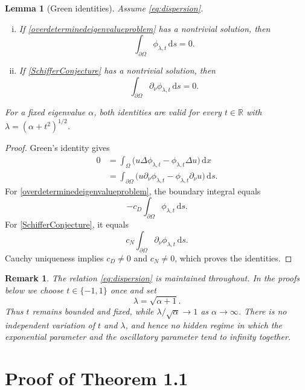 \documentclass[12pt]{article}
\newcommand{\R}{\mathbb{R}}
\numberwithin{equation}{section}
\newtheorem{lemma}[theorem]{Lemma}
\newtheorem{remark}[theorem]{Remark}
\numberwithin{equation}{section}
\newcommand{\pd}{\partial}
\newcommand{\dd}{\,\mathrm{d}}
\begin{document}
\begin{lemma}[Green identities]\label{prop:green}
Assume \eqref{eq:dispersion}.
\begin{enumerate}[(i)]
\item If \eqref{overdeterminedeigenvalueproblem} has a nontrivial solution, then
\begin{equation*}\label{eq:transform-D}
\int_{\pd\Omega}\phi_{\lambda,t}\dd s=0.
\end{equation*}
\item If \eqref{SchifferConjecture} has a nontrivial solution, then
\begin{equation*}\label{eq:transform-N}
\int_{\pd\Omega}\pd_\nu\phi_{\lambda,t}\dd s=0.
\end{equation*}
\end{enumerate}
For a fixed eigenvalue $\alpha$, both identities are valid for every
$t\in\R$ with $\lambda=\left(\alpha+t^2\right)^{1/2}$.
\end{lemma}

\begin{proof}
Green's identity gives
\begin{align*}
0
&=\int_\Omega
\bigl(u\Delta\phi_{\lambda,t}
-\phi_{\lambda,t}\Delta u\bigr)\dd x\\
&=\int_{\pd\Omega}
\bigl(u\pd_\nu\phi_{\lambda,t}
-\phi_{\lambda,t}\pd_\nu u\bigr)\dd s.
\end{align*}
For \eqref{overdeterminedeigenvalueproblem}, the boundary integral equals
\[
-c_D\int_{\pd\Omega}\phi_{\lambda,t}\dd s.
\]
For \eqref{SchifferConjecture}, it equals
\[
c_N\int_{\pd\Omega}\pd_\nu\phi_{\lambda,t}\dd s.
\]
Cauchy
uniqueness implies $c_D\ne0$ and $c_N\ne0$, which proves the identities.
\end{proof}

\begin{remark}
\emph{The relation \eqref{eq:dispersion} is maintained throughout. In the proofs
below we choose $t\in\{-1,1\}$ once and set
\[
\lambda=\sqrt{\alpha+1}.
\]
Thus $t$ remains bounded and fixed, while
$\lambda/\sqrt\alpha\to1$ as $\alpha\to\infty$.  There is no independent
variation of $t$ and $\lambda$, and hence no hidden regime in which the
exponential parameter and the oscillatory parameter tend to infinity
together.}
\end{remark}

\section{Proof of Theorem 1.1}
\end{document}
